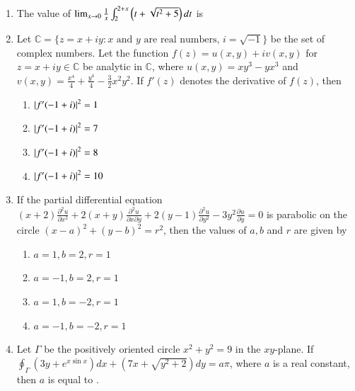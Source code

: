 \documentclass[a4paper,10pt]{article}
\begin{document}
\begin{enumerate}
\item The value of $\lim_{x\to 0} \frac{1}{x} \int_{2}^{2+x} \left(t + \sqrt{t^2+5}\right) dt$ is

\hfill{}
\begin{enumerate}
	\begin{multicols}{4}
    \item $0$
    \item $4$
    \item $5$
    \item $6$
    \end{multicols}
\end{enumerate}

\item Let $\mathbb{C} = \{z = x+iy \colon x \text{ and } y \text{ are real numbers, } i = \sqrt{-1}\}$ be the set of complex numbers. Let the function $f(z) = u(x,y) + iv(x,y)$ for $z=x+iy \in \mathbb{C}$ be analytic in $\mathbb{C}$, where
$u(x,y) = xy^3 - yx^3$ and $v(x,y) = \frac{x^4}{4} + \frac{y^4}{4} - \frac{3}{2}x^2y^2$.
If $f'(z)$ denotes the derivative of $f(z)$, then

\hfill{}
\begin{enumerate}
    \item $\left\vert f'(-1+i)\right\vert^2 = 1$
    \item $\left\vert f'(-1+i)\right\vert^2 = 7$
    \item $\left\vert f'(-1+i)\right\vert^2 = 8$
    \item $\left\vert f'(-1+i)\right\vert^2 = 10$
\end{enumerate}

\item If the partial differential equation
$(x+2)\frac{\partial^2 u}{\partial x^2} + 2(x+y)\frac{\partial^2 u}{\partial x \partial y} + 2(y-1)\frac{\partial^2 u}{\partial y^2} - 3y^2\frac{\partial u}{\partial y} = 0$
is parabolic on the circle $(x-a)^2 + (y-b)^2 = r^2$, then the values of $a, b$ and $r$ are given by

\hfill{}
\begin{enumerate}
    \item $a=1, b=2, r=1$
    \item $a=-1, b=2, r=1$
    \item $a=1, b=-2, r=1$
    \item $a=-1, b=-2, r=1$
\end{enumerate}

\item Let $\Gamma$ be the positively oriented circle $x^2 + y^2 = 9$ in the $xy$-plane. If
$\oint_{\Gamma} (3y + e^{x \sin x}) dx + (7x + \sqrt{y^2+2}) dy = a\pi$,
where $a$ is a real constant, then $a$ is equal to \underline{\hspace{2cm}}.


\end{enumerate}
\end{document}
